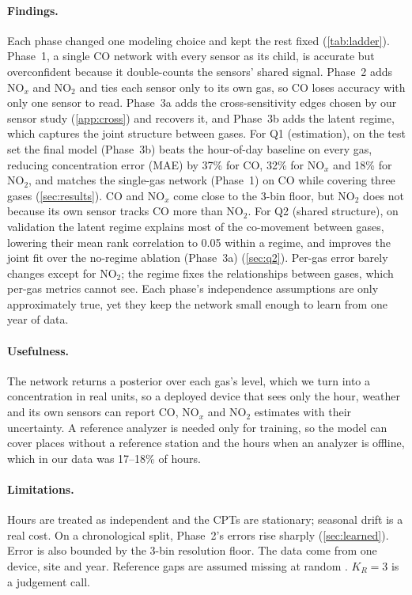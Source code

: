 \paragraph{Findings.} Each phase changed one modeling choice and kept the rest
fixed (\cref{tab:ladder}). Phase~1, a single CO network with every sensor as
its child, is accurate but overconfident because it double-counts the sensors'
shared signal. Phase~2 adds NO$_x$ and NO$_2$ and ties each sensor only to its
own gas, so CO loses accuracy with only one sensor to read. Phase~3a adds the
cross-sensitivity edges chosen by our sensor study (\cref{app:cross}) and
recovers it, and Phase~3b adds the latent regime, which captures the joint
structure between gases. For Q1 (estimation), on the test set the final model
(Phase~3b) beats the hour-of-day baseline on every gas, reducing concentration
error (MAE) by 37\% for CO, 32\% for NO$_x$ and 18\% for NO$_2$, and matches
the single-gas network (Phase~1) on CO while covering three gases
(\cref{sec:results}). CO and NO$_x$ come close to the 3-bin floor, but NO$_2$
does not because its own sensor tracks CO more than NO$_2$. For Q2 (shared
structure), on validation the latent regime explains most of the co-movement
between gases, lowering their mean rank correlation to 0.05 within a regime,
and improves the joint fit over the no-regime ablation (Phase~3a)
(\cref{sec:q2}). Per-gas error barely changes except for NO$_2$; the regime 
fixes the relationships between gases, which per-gas metrics cannot see. 
Each phase's independence assumptions are only approximately true, yet they 
keep the network small enough to learn from one year of data.

\paragraph{Usefulness.} The network returns a posterior over each gas's level, 
which we turn into a concentration in real units, so a deployed device that sees 
only the hour, weather and its own sensors can report CO, NO$_x$ and NO$_2$ 
estimates with their uncertainty. A reference analyzer is needed only for training, 
so the model can cover places without a reference station and the hours when an 
analyzer is offline, which in our data was 17--18\% of hours.

\paragraph{Limitations.} Hours are treated as independent and the CPTs are stationary;
seasonal drift is a real cost. On a chronological split, Phase~2's
errors rise sharply (\cref{sec:learned}).
Error is also bounded by the 3-bin resolution floor. The data come from one device, 
site and year. Reference gaps are assumed missing at random \citep{rubin1976inference}. 
$K_R = 3$ is a judgement call.

